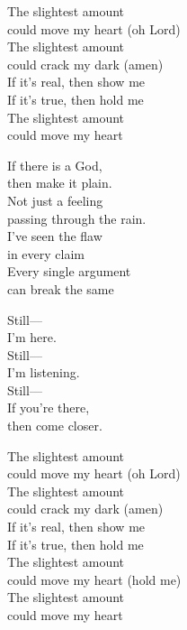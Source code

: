 \begin{lyrics}
The slightest amount\\
could move my heart
(oh Lord)\\
The slightest amount\\
could crack my dark
(amen)\\
If it’s real, then show me\\
If it’s true, then hold me\\
The slightest amount\\
could move my heart

If there is a God,\\
then make it plain.\\
Not just a feeling\\
passing through the rain.\\
I’ve seen the flaw\\
in every claim\\
Every single argument\\
can break the same

Still—\\
I’m here.\\
Still—\\
I’m listening.\\
Still—\\
If you’re there,\\
then come closer.

The slightest amount\\
could move my heart
(oh Lord)\\
The slightest amount\\
could crack my dark
(amen)\\
If it’s real, then show me\\
If it’s true, then hold me\\
The slightest amount\\
could move my heart
(hold me)\\
The slightest amount\\
could move my heart
\end{lyrics}

